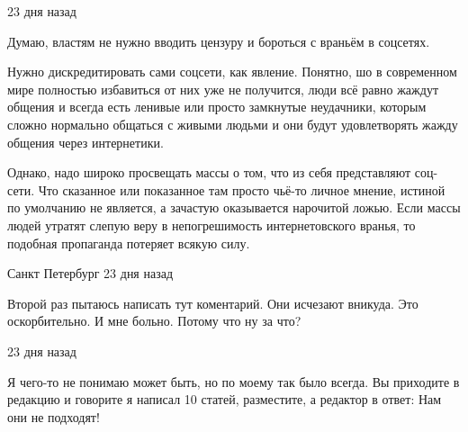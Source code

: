 \begin{itemize}
 23 дня назад  

Думаю, властям не нужно вводить цензуру и бороться с враньём в соцсетях.

Нужно дискредитировать сами соцсети, как явление. Понятно, шо в современном
мире полностью избавиться от них уже не получится, люди всё равно жаждут
общения и всегда есть ленивые или просто замкнутые неудачники, которым сложно
нормально общаться с живыми людьми и они будут удовлетворять жажду общения
через интернетики.

Однако, надо широко просвещать массы о том, что из себя представляют соц-сети.
Что сказанное или показанное там просто чьё-то личное мнение, истиной по
умолчанию не является, а зачастую оказывается нарочитой ложью. Если массы людей
утратят слепую веру в непогрешимость интернетовского вранья, то подобная
пропаганда потеряет всякую силу.

 Санкт Петербург 23 дня назад  

Второй раз пытаюсь написать тут коментарий. Они исчезают вникуда. Это
оскорбительно. И мне больно. Потому что ну за что?

 23 дня назад  

Я чего-то не понимаю может быть, но по моему так было всегда. Вы приходите в
редакцию и говорите я написал 10 статей, разместите, а редактор в ответ: Нам
они не подходят!

\end{itemize}


